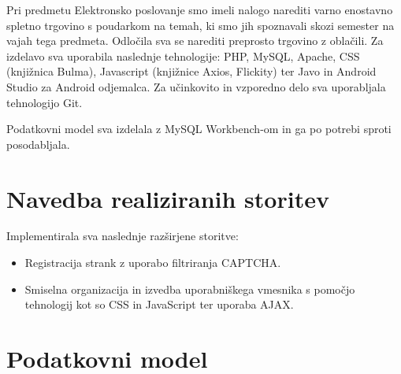 \documentclass[a4paper,12pt]{report}
\begin{document}
Pri predmetu Elektronsko poslovanje smo imeli nalogo narediti varno enostavno spletno trgovino s poudarkom na temah, ki smo jih spoznavali skozi semester na vajah tega predmeta. Odločila sva se narediti preprosto trgovino z oblačili. Za izdelavo sva uporabila naslednje tehnologije: PHP, MySQL, Apache, CSS (knjižnica Bulma), Javascript (knjižnice Axios, Flickity) ter Javo in Android Studio za Android odjemalca. Za učinkovito in vzporedno delo sva uporabljala tehnologijo Git.

Podatkovni model sva izdelala z MySQL Workbench-om in ga po potrebi sproti posodabljala. 


\chapter{Navedba realiziranih storitev}

Implementirala sva naslednje razširjene storitve:

\begin{itemize}
    \item Registracija strank z uporabo filtriranja CAPTCHA.
    \item Smiselna organizacija in izvedba uporabniškega vmesnika s pomočjo tehnologij kot so CSS in JavaScript ter uporaba AJAX.
\end{itemize}


\chapter{Podatkovni model}
\end{document}

